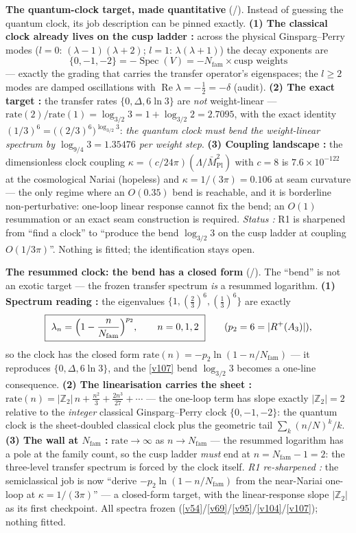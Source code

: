 \documentclass[11pt,a4paper]{article}
\newcommand{\Z}{\mathbb{Z}}
\newcommand{\Nfam}{N_{\mathrm{fam}}}
\begin{document}
\par\smallskip\noindent\textbf{The quantum-clock target, made quantitative} (\mE/\mC).
Instead of guessing the quantum clock, its job description can be pinned exactly. \textbf{(1) The
classical clock already lives on the cusp ladder \mE:} across the physical Ginsparg--Perry modes
($l=0$: $(\lambda{-}1)(\lambda{+}2)$; $l=1$: $\lambda(\lambda{+}1)$) the decay exponents are
\[
  \boxed{\ \{0,-1,-2\}=-\operatorname{Spec}(V)=-\Nfam\times\text{cusp weights}\ }
\]
--- exactly the grading that carries the transfer operator's eigenspaces; the $l\ge2$ modes
are damped oscillations with $\operatorname{Re}\lambda=-\tfrac12=-\delta$ (audit). \textbf{(2) The exact
target \mE:} the transfer rates $\{0,\Delta,6\ln3\}$ are \emph{not} weight-linear ---
$\mathrm{rate}(2)/\mathrm{rate}(1)=\log_{3/2}3=1+\log_{3/2}2=2.7095$, with the exact identity
$(1/3)^6=\bigl((2/3)^6\bigr)^{\log_{3/2}3}$: \emph{the quantum clock must bend the weight-linear spectrum
by $\log_{9/4}3=1.35476$ per weight step}. \textbf{(3) Coupling landscape \mE:} the dimensionless clock
coupling $\kappa=(c/24\pi)(\Lambda/\bar M_{\mathrm{Pl}}^2)$ with $c=8$ is $7.6\times10^{-122}$ at the
cosmological Nariai (hopeless) and $\kappa=1/(3\pi)=0.106$ at seam curvature --- the only regime where an
$O(0.35)$ bend is reachable, and it is borderline non-perturbative: one-loop linear response cannot fix
the bend; an $O(1)$ resummation or an exact seam construction is required. \emph{Status \mC:} R1 is
sharpened from ``find a clock'' to ``produce the bend $\log_{3/2}3$ on the cusp ladder at coupling
$O(1/3\pi)$''. Nothing is fitted; the identification stays open. 


\par\smallskip\noindent\textbf{The resummed clock: the bend has a closed form} (\mE/\mC).
The ``bend'' is not an exotic target --- the frozen transfer spectrum \emph{is} a resummed logarithm.
\textbf{(1) Spectrum reading \mE:} the eigenvalues $\{1,(\tfrac23)^6,(\tfrac13)^6\}$ are exactly
\[
  \boxed{\ \lambda_n=\Bigl(1-\frac n{\Nfam}\Bigr)^{p_2},\qquad n=0,1,2\ }
  \qquad(p_2=6=|R^+(A_3)|),
\]
so the clock has the closed form $\mathrm{rate}(n)=-p_2\ln(1-n/\Nfam)$ --- it reproduces
$\{0,\Delta,6\ln3\}$, and the \vref{v107} bend $\log_{3/2}3$ becomes a one-line consequence. \textbf{(2) The
linearisation carries the sheet \mE:} $\mathrm{rate}(n)=|\Z_2|\,n+\tfrac{n^2}3+\tfrac{2n^3}{27}+\cdots$
--- the one-loop term has slope exactly $|\Z_2|=2$ relative to the \emph{integer} classical
Ginsparg--Perry clock $\{0,-1,-2\}$: the quantum clock is the sheet-doubled classical clock plus the
geometric tail $\sum_k(n/N)^k/k$. \textbf{(3) The wall at $\Nfam$ \mE:} $\mathrm{rate}\to\infty$ as
$n\to\Nfam$ --- the resummed logarithm has a pole at the family count, so the cusp ladder \emph{must}
end at $n=\Nfam-1=2$: the three-level transfer spectrum is forced by the clock itself. \emph{R1
re-sharpened \mC:} the semiclassical job is now ``derive $-p_2\ln(1-n/\Nfam)$ from the near-Nariai
one-loop at $\kappa=1/(3\pi)$'' --- a closed-form target, with the linear-response slope $|\Z_2|$ as
its first checkpoint. All spectra frozen (\vref{v54}/\vref{v69}/\vref{v95}/\vref{v104}/\vref{v107}); nothing fitted. 
\end{document}
